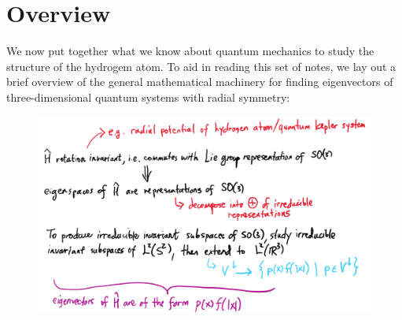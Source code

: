 \section{Overview}
We now put together what we know about quantum mechanics to study the structure of the hydrogem atom. To aid in reading this set of notes, we lay out a brief overview of the general mathematical machinery for finding eigenvectors of three-dimensional quantum systems with radial symmetry:
\begin{figure}[ht]
    \includegraphics[width=\textwidth]{figures/quantum_kepler}
    \centering
\end{figure}
